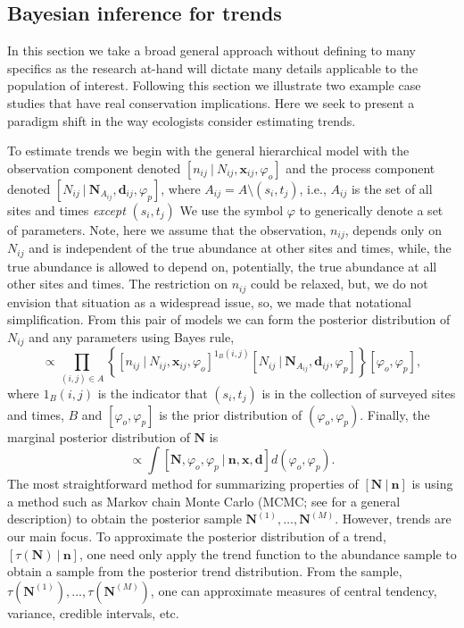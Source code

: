 \documentclass[12pt,letter]{article}
\newcommand{\Nij}{\ensuremath{N_{ij}}}
\newcommand{\nij}{\ensuremath{n_{ij}}}
\newcommand{\dij}{\ensuremath{\mathbf{d}_{ij}}}
\newcommand{\xij}{\ensuremath{\mathbf{x}_{ij}}}
\begin{document}
\subsection{Bayesian inference for trends}

In this section we take a broad general approach without defining to many specifics as the research at-hand will dictate many details applicable to the population of interest. Following this section we illustrate two example case studies that have real conservation implications. Here we seek to present a paradigm shift in the way ecologists consider estimating trends. 

To estimate trends we begin with the general hierarchical model with the observation component denoted $[n_{ij}\ |\ \Nij,\xij, \varphi_o]$ and the process component denoted $[\Nij\ |\ \mathbf{N}_{A_{ij}},\dij,\varphi_p]$, where $A_{ij} = A\setminus (s_i,t_j)$, i.e., $A_{ij}$ is the set of all sites and times {\em except} $(s_i,t_j)$ We use the symbol $\varphi$ to generically denote a set of parameters. Note, here we assume that the observation, $\nij$, depends only on $\Nij$ and is independent of the true abundance at other sites and times, while, the true abundance is allowed to depend on, potentially, the true abundance at all other sites and times. The restriction on $\nij$ could be relaxed, but, we do not envision that situation as a widespread issue, so, we made that notational simplification. From this pair of models we can form the posterior distribution of $\Nij$ and any parameters using Bayes rule,
\begin{equation}
[\mathbf{N}, \varphi_o, \varphi_p\ |\ \mathbf{n}, \mathbf{x}, \mathbf{d}] \propto \prod_{(i,j)\in A}\left\{[n_{ij}\ |\ \Nij,\xij, \varphi_o]^{1_B(i,j)} [\Nij\ |\ \mathbf{N}_{A_{ij}}, \dij, \varphi_p]\right\}[\varphi_o, \varphi_p],
\end{equation}
where $1_B(i,j)$ is the indicator that $(s_i,t_j)$ is in the collection of surveyed sites and times, $B$ and $[\varphi_o, \varphi_p]$ is the prior distribution of $(\varphi_o, \varphi_p)$. Finally, the marginal posterior distribution of $\mathbf{N}$ is 
\begin{equation}
[\mathbf{N}|\mathbf{n}] \propto \int [\mathbf{N}, \varphi_o, \varphi_p\ |\ \mathbf{n}, \mathbf{x}, \mathbf{d}]d(\varphi_o,\varphi_p).\end{equation}
The most straightforward method for summarizing properties of $[\mathbf{N}\ |\ \mathbf{n}]$ is using a method such as Markov chain Monte Carlo (MCMC; see \citealt{Givens:2005dy} for a general description) to obtain the posterior sample $\mathbf{N}^{(1)},\dots,\mathbf{N}^{(M)}$.  However, trends are our main focus. To approximate the posterior distribution of a trend, $[\tau(\mathbf{N})\ |\ \mathbf{n}]$, one need only apply the trend function to the abundance sample to obtain a sample from the posterior trend distribution. From the sample, $\tau(\mathbf{N}^{(1)}),\dots,\tau(\mathbf{N}^{(M)})$, one can approximate measures of central tendency, variance, credible intervals, etc.
\end{document}
